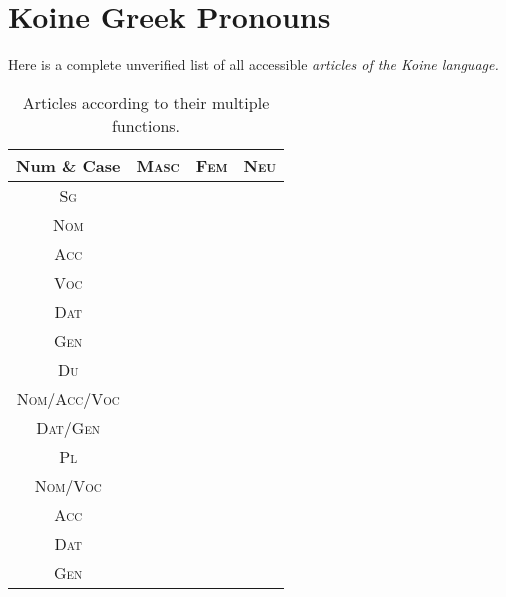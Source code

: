 \documentclass[10pt]{memoir}
\newcommand{\tsc}[1]{\textsc{#1}}
\begin{document}
    \section*{Koine Greek Pronouns}
    Here is a complete unverified list of all accessible \em articles \normal of the Koine language.


    \begin{table}[H]
        \begin{tabular}{c|ccc}
            \textbf{Num \& Case} & \textbf{\tsc{Masc}} & \textbf{\tsc{Fem}} & \textbf{\tsc{Neu}} \\
            \hline
            \tsc{Sg} \\
            \tsc{Nom} \\
            \tsc{Acc} \\
            \tsc{Voc} \\
            \tsc{Dat} \\
            \tsc{Gen} \\
            \hline
            \tsc{Du} \\
            \tsc{Nom/Acc/Voc} \\
            \tsc{Dat/Gen} \\
            \hline
            \tsc{Pl} \\
            \tsc{Nom/Voc} \\
            \tsc{Acc} \\
            \tsc{Dat} \\
            \tsc{Gen} \\
        \end{tabular}
        \caption{Articles according to their multiple functions.}
    \end{table}
\end{document}

